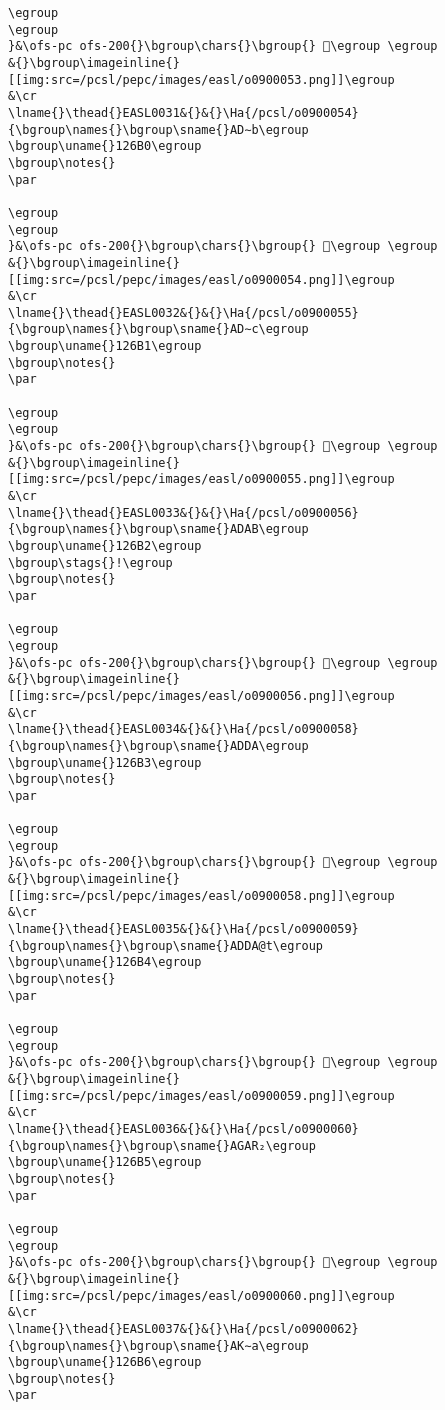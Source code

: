 \begin{verbatim}
\egroup
\egroup
}&\ofs-pc ofs-200{}\bgroup\chars{}\bgroup{} 𒚯\egroup \egroup
&{}\bgroup\imageinline{}[[img:src=/pcsl/pepc/images/easl/o0900053.png]]\egroup
&\cr
\lname{}\thead{}EASL0031&{}&{}\Ha{/pcsl/o0900054}{\bgroup\names{}\bgroup\sname{}AD∼b\egroup
\bgroup\uname{}126B0\egroup
\bgroup\notes{}
\par 

\egroup
\egroup
}&\ofs-pc ofs-200{}\bgroup\chars{}\bgroup{} 𒚰\egroup \egroup
&{}\bgroup\imageinline{}[[img:src=/pcsl/pepc/images/easl/o0900054.png]]\egroup
&\cr
\lname{}\thead{}EASL0032&{}&{}\Ha{/pcsl/o0900055}{\bgroup\names{}\bgroup\sname{}AD∼c\egroup
\bgroup\uname{}126B1\egroup
\bgroup\notes{}
\par 

\egroup
\egroup
}&\ofs-pc ofs-200{}\bgroup\chars{}\bgroup{} 𒚱\egroup \egroup
&{}\bgroup\imageinline{}[[img:src=/pcsl/pepc/images/easl/o0900055.png]]\egroup
&\cr
\lname{}\thead{}EASL0033&{}&{}\Ha{/pcsl/o0900056}{\bgroup\names{}\bgroup\sname{}ADAB\egroup
\bgroup\uname{}126B2\egroup
\bgroup\stags{}!\egroup
\bgroup\notes{}
\par 

\egroup
\egroup
}&\ofs-pc ofs-200{}\bgroup\chars{}\bgroup{} 𒚲\egroup \egroup
&{}\bgroup\imageinline{}[[img:src=/pcsl/pepc/images/easl/o0900056.png]]\egroup
&\cr
\lname{}\thead{}EASL0034&{}&{}\Ha{/pcsl/o0900058}{\bgroup\names{}\bgroup\sname{}ADDA\egroup
\bgroup\uname{}126B3\egroup
\bgroup\notes{}
\par 

\egroup
\egroup
}&\ofs-pc ofs-200{}\bgroup\chars{}\bgroup{} 𒚳\egroup \egroup
&{}\bgroup\imageinline{}[[img:src=/pcsl/pepc/images/easl/o0900058.png]]\egroup
&\cr
\lname{}\thead{}EASL0035&{}&{}\Ha{/pcsl/o0900059}{\bgroup\names{}\bgroup\sname{}ADDA@t\egroup
\bgroup\uname{}126B4\egroup
\bgroup\notes{}
\par 

\egroup
\egroup
}&\ofs-pc ofs-200{}\bgroup\chars{}\bgroup{} 𒚴\egroup \egroup
&{}\bgroup\imageinline{}[[img:src=/pcsl/pepc/images/easl/o0900059.png]]\egroup
&\cr
\lname{}\thead{}EASL0036&{}&{}\Ha{/pcsl/o0900060}{\bgroup\names{}\bgroup\sname{}AGAR₂\egroup
\bgroup\uname{}126B5\egroup
\bgroup\notes{}
\par 

\egroup
\egroup
}&\ofs-pc ofs-200{}\bgroup\chars{}\bgroup{} 𒚵\egroup \egroup
&{}\bgroup\imageinline{}[[img:src=/pcsl/pepc/images/easl/o0900060.png]]\egroup
&\cr
\lname{}\thead{}EASL0037&{}&{}\Ha{/pcsl/o0900062}{\bgroup\names{}\bgroup\sname{}AK∼a\egroup
\bgroup\uname{}126B6\egroup
\bgroup\notes{}
\par 


\end{verbatim}

